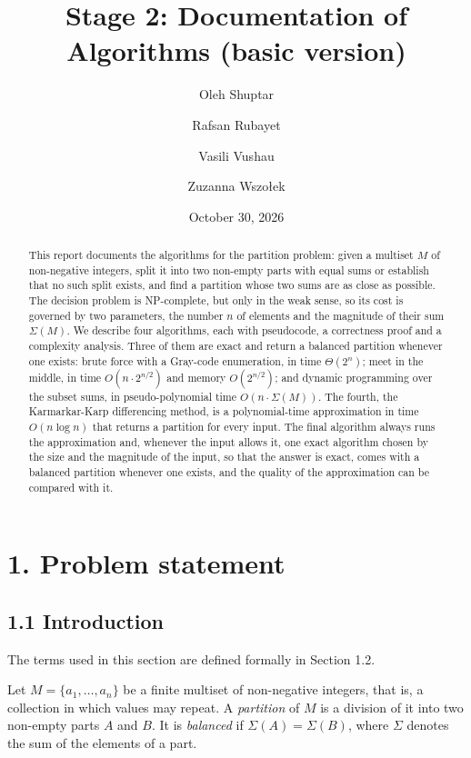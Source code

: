 \documentclass[
]{article}
\title{Stage 2: Documentation of Algorithms (basic version)}
\author{Oleh Shuptar \and Rafsan Rubayet \and Vasili Vushau \and Zuzanna
Wszołek}
\date{October 30, 2026}
\begin{document}
\maketitle
\begin{abstract}
This report documents the algorithms for the partition problem: given a
multiset \(M\) of non-negative integers, split it into two non-empty
parts with equal sums or establish that no such split exists, and find a
partition whose two sums are as close as possible. The decision problem
is NP-complete, but only in the weak sense, so its cost is governed by
two parameters, the number \(n\) of elements and the magnitude of their
sum \(\Sigma(M)\). We describe four algorithms, each with pseudocode, a
correctness proof and a complexity analysis. Three of them are exact and
return a balanced partition whenever one exists: brute force with a
Gray-code enumeration, in time \(\Theta(2^n)\); meet in the middle, in
time \(O(n \cdot 2^{n/2})\) and memory \(O(2^{n/2})\); and dynamic
programming over the subset sums, in pseudo-polynomial time
\(O(n \cdot \Sigma(M))\). The fourth, the Karmarkar-Karp differencing
method, is a polynomial-time approximation in time \(O(n \log n)\) that
returns a partition for every input. The final algorithm always runs the
approximation and, whenever the input allows it, one exact algorithm
chosen by the size and the magnitude of the input, so that the answer is
exact, comes with a balanced partition whenever one exists, and the
quality of the approximation can be compared with it.
\end{abstract}

\clearpage

{
\setcounter{tocdepth}{2}
\tableofcontents
}
\clearpage

\hypertarget{problem-statement}{%
\section{1. Problem statement}\label{problem-statement}}

\hypertarget{introduction}{%
\subsection{1.1 Introduction}\label{introduction}}

The terms used in this section are defined formally in Section 1.2.

Let \(M = \{a_1, \dots, a_n\}\) be a finite multiset of non-negative
integers, that is, a collection in which values may repeat. A
\emph{partition} of \(M\) is a division of it into two non-empty parts
\(A\) and \(B\). It is \emph{balanced} if \(\Sigma(A) = \Sigma(B)\),
where \(\Sigma\) denotes the sum of the elements of a part.
\end{document}
